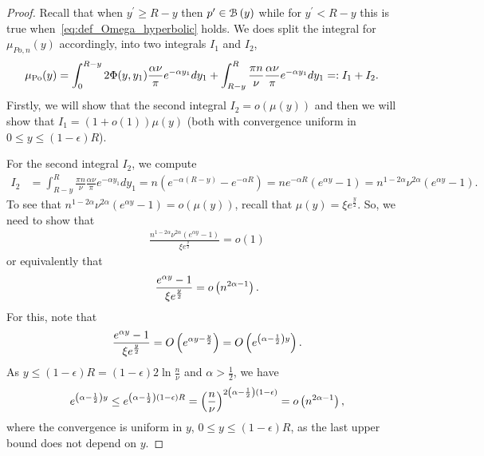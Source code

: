 \begin{proof}
Recall that when $y^\prime \ge R - y$ then $p^\prime \in {\mathcal B}\left(y\right)$ while for $y^\prime < R - y$ this is true when~\eqref{eq:def_Omega_hyperbolic} holds. We does split the integral for $\mu_{Po,n}(y)$ accordingly, into two integrals $I_1$ and $I_2$,
\begin{align*}
\mu_{{\mathrm{Po}}}(y) 
&= \int_0^{R-y} 2\Phi(y,y_1)\frac{\alpha\nu}{\pi}e^{-\alpha y_1} dy_1+\int_{R-y}^R \frac{\pi n}{\nu} \frac{\alpha \nu}{\pi}e^{-\alpha y_1}dy_1 =: I_1+I_2.
\end{align*}
Firstly, we will show that the second integral $I_2=o(\mu(y))$ and then we will show that $I_1 = (1+o(1))\mu(y)$ (both with  convergence uniform in $0\leq y\leq (1-\epsilon)R$).

For the second integral $I_2$, we compute
\begin{align*}
I_2 &= \int_{R-y}^R \frac{\pi n}{\nu} \frac{\alpha \nu}{\pi}e^{-\alpha y_1}dy_1 =n(e^{-\alpha(R-y)}-e^{-\alpha R}) =ne^{-\alpha R}(e^{\alpha y} -1) =n^{1-2\alpha}\nu^{2\alpha}(e^{\alpha y} -1). 	%
\end{align*}
To see that $n^{1-2\alpha}\nu^{2\alpha}(e^{\alpha y} -1) = o(\mu(y))$, recall that $\mu(y)=\xi e^{\frac{y}{2}}$. So, we need to show that
\begin{align*}
\frac{n^{1-2\alpha}\nu^{2\alpha}(e^{\alpha y} -1)}{\xi e^{\frac{y}{2}}} = o(1)
\end{align*}
or equivalently that
\begin{align*}
\frac{e^{\alpha y}-1}{\xi e^{\frac{y}{2}}}=o\left(n^{2\alpha-1}\right).
\end{align*}
For this, note that
\begin{align*}
\frac{e^{\alpha y}-1}{\xi e^{\frac{y}{2}}}=O\left(e^{\alpha y-\frac{y}{2}}\right) = O\left(e^{\left(\alpha-\frac{1}{2}\right)y}\right).
\end{align*}
As $y \leq (1-\epsilon)R =(1-\epsilon)2\ln \frac{n}{\nu}$ and $\alpha > \frac{1}{2}$, we have 
\[
	e^{\left(\alpha-\frac{1}{2}\right)y} \leq e^{\left(\alpha-\frac{1}{2}\right)(1-\epsilon)R} = \left(\frac{n}{\nu}\right)^{2\left(\alpha-\frac{1}{2}\right)(1-\epsilon)} = o\left(n^{2\alpha-1}\right),
\]
where the convergence is uniform in $y$, $0\leq y\leq (1-\epsilon)R$, as the last upper bound does not depend on $y$.


\end{proof}
